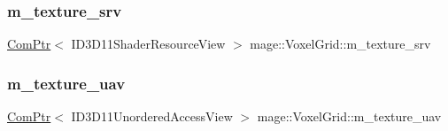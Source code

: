 \hypertarget{classmage_1_1_voxel_grid_a15a383e4fcbc948e89537c8a391fdd0f}{}\label{classmage_1_1_voxel_grid_a15a383e4fcbc948e89537c8a391fdd0f} 
\subsubsection{\texorpdfstring{m\+\_\+texture\+\_\+srv}{m\_texture\_srv}}
{\footnotesize\ttfamily \hyperlink{namespacemage_ae74f374780900893caa5555d1031fd79}{Com\+Ptr}$<$ I\+D3\+D11\+Shader\+Resource\+View $>$ mage\+::\+Voxel\+Grid\+::m\+\_\+texture\+\_\+srv\hspace{0.3cm}{\ttfamily [private]}}

\hypertarget{classmage_1_1_voxel_grid_a8e253c0e029cd47700a259500d2bce02}{}\label{classmage_1_1_voxel_grid_a8e253c0e029cd47700a259500d2bce02} 
\subsubsection{\texorpdfstring{m\+\_\+texture\+\_\+uav}{m\_texture\_uav}}
{\footnotesize\ttfamily \hyperlink{namespacemage_ae74f374780900893caa5555d1031fd79}{Com\+Ptr}$<$ I\+D3\+D11\+Unordered\+Access\+View $>$ mage\+::\+Voxel\+Grid\+::m\+\_\+texture\+\_\+uav\hspace{0.3cm}{\ttfamily [private]}}

